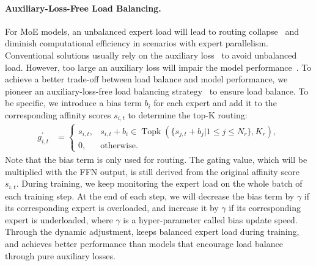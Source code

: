 \paragraph{Auxiliary-Loss-Free Load Balancing.}
For MoE models, an unbalanced expert load will lead to routing collapse~\citep{moe} and diminish computational efficiency in scenarios with expert parallelism. 
Conventional solutions usually rely on the auxiliary loss~\citep{switch,gshard} to avoid unbalanced load. 
However, too large an auxiliary loss will impair the model performance~\citep{noaux_tc}. 
To achieve a better trade-off between load balance and model performance, we pioneer an auxiliary-loss-free load balancing strategy~\citep{noaux_tc} to ensure load balance. 
To be specific, we introduce a bias term $b_i$ for each expert and add it to the corresponding affinity scores $s_{i,t}$ to determine the top-K routing:
\begin{align}
    g^{\prime}_{i,t} & = \begin{cases} 
    s_{i,t}, & s_{i,t} + b_i \in \operatorname{Topk} (\{ s_{j, t} + b_j | 1 \leq j \leq N_r \}, K_{r}), \\
    0, & \text{otherwise}.
    \end{cases}
\end{align}
Note that the bias term is only used for routing.
The gating value, which will be multiplied with the FFN output, is still derived from the original affinity score $s_{i,t}$.
During training, we keep monitoring the expert load on the whole batch of each training step.
At the end of each step, we will decrease the bias term by $\gamma$ if its corresponding expert is overloaded, and increase it by $\gamma$ if its corresponding expert is underloaded, where $\gamma$ is a hyper-parameter called bias update speed.
Through the dynamic adjustment, \dsviii{} keeps balanced expert load during training, and achieves better performance than models that encourage load balance through pure auxiliary losses.

